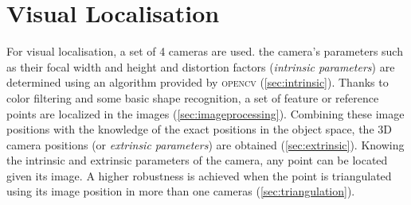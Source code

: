 \section{Visual Localisation}

For visual localisation, a set of 4 cameras are used. the camera's parameters such as their focal width and height and distortion factors (\textit{intrinsic parameters}) are determined using an algorithm provided by \textsc{opencv} (\ref{sec:intrinsic}). 
Thanks to color filtering and some basic shape recognition, a set of feature or reference points are localized in the images (\ref{sec:imageprocessing}).
Combining these image positions with the knowledge of the exact positions in the object space, the 3D camera positions (or \textit{extrinsic parameters}) are obtained (\ref{sec:extrinsic}). 
Knowing the intrinsic and extrinsic parameters of the camera, any point can be located given its image. A higher robustness is achieved when the point is triangulated using its image position in more than one cameras (\ref{sec:triangulation}).







%	
%	
